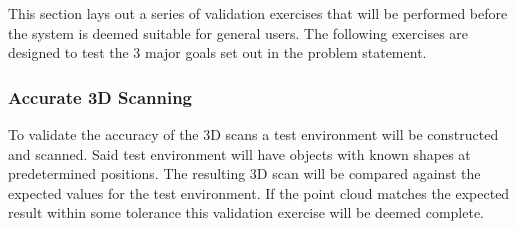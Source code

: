 \documentclass[12pt, titlepage]{article}
\begin{document}





This section lays out a series of validation exercises that will be performed before the system is deemed
suitable for general users. The following exercises are designed to test the 3 major goals set out
in the problem statement.

\subsubsection{Accurate 3D Scanning}

To validate the accuracy of the 3D scans a test environment will be constructed and
scanned. Said test environment will have objects with known shapes at predetermined positions.
The resulting 3D scan will be compared against the expected values for the test environment.
If the point cloud matches the expected result within some tolerance this validation exercise will
be deemed complete. 
\end{document}
